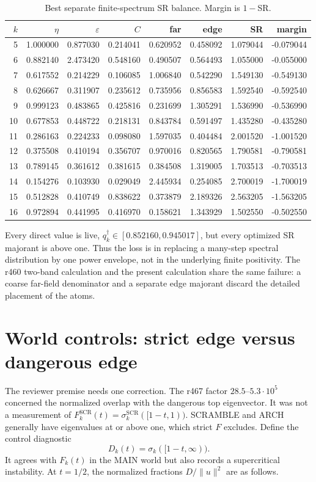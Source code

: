 \documentclass[11pt]{article}
\theoremstyle{remark}
\newcommand{\qdag}{q^\dagger}
\newcommand{\scr}{\mathrm{SCR}}
\begin{document}
\begin{table}[ht]
\centering\small
\caption{Best separate finite-spectrum SR balance.  Margin is $1-$SR.}
\label{tab:sr}
\begin{tabular}{@{}rrrrrrrr@{}}
\toprule
$k$&$\eta$&$\varepsilon$&$C$&far&edge&SR&margin\\
\midrule
5 &1.000000&0.877030&0.214041&0.620952&0.458092&1.079044&-0.079044\\
6 &0.882140&2.473420&0.548160&0.490507&0.564493&1.055000&-0.055000\\
7 &0.617552&0.214229&0.106085&1.006840&0.542290&1.549130&-0.549130\\
8 &0.626667&0.311907&0.235612&0.735956&0.856583&1.592540&-0.592540\\
9 &0.999123&0.483865&0.425816&0.231699&1.305291&1.536990&-0.536990\\
10&0.677853&0.448722&0.218131&0.843784&0.591497&1.435280&-0.435280\\
11&0.286163&0.224233&0.098080&1.597035&0.404484&2.001520&-1.001520\\
12&0.375508&0.410194&0.356707&0.970016&0.820565&1.790581&-0.790581\\
13&0.789145&0.361612&0.381615&0.384508&1.319005&1.703513&-0.703513\\
14&0.154276&0.103930&0.029049&2.445934&0.254085&2.700019&-1.700019\\
15&0.512828&0.410749&0.838622&0.373879&2.189326&2.563205&-1.563205\\
16&0.972894&0.441995&0.416970&0.158621&1.343929&1.502550&-0.502550\\
\bottomrule
\end{tabular}
\end{table}

Every direct value is live,
$\qdag_k\in[0.852160,0.945017]$, but every optimized SR majorant is
above one.  Thus the loss is in replacing a many-step spectral
distribution by one power envelope, not in the underlying finite
positivity.  The r460 two-band calculation and the present calculation
share the same failure: a coarse far-field denominator and a separate
edge majorant discard the detailed placement of the atoms.

\section{World controls: strict edge versus dangerous edge}

The reviewer premise needs one correction.  The r467 factor
$28.5$--$5.3\cdot10^5$ concerned the normalized overlap with the
dangerous top eigenvector.  It was not a measurement of
$F^\scr_k(t)=\sigma^\scr_k([1-t,1))$.  SCRAMBLE and ARCH generally
have eigenvalues at or above one, which strict $F$ excludes.  Define
the control diagnostic
\[
 D_k(t)=\sigma_k([1-t,\infty)).
\]
It agrees with $F_k(t)$ in the MAIN world but also records a
supercritical instability.  At $t=1/2$, the normalized fractions
$D/\|u\|^2$ are as follows.
\end{document}
